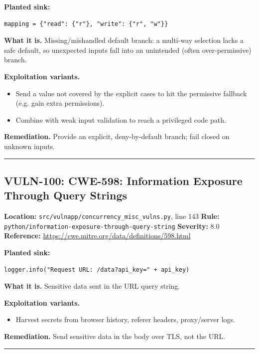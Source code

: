 \documentclass[11pt,a4paper]{article}
\begin{document}
\noindent\textbf{Planted sink:}
\begin{lstlisting}
mapping = {"read": {"r"}, "write": {"r", "w"}}
\end{lstlisting}
\noindent\textbf{What it is.} Missing/mishandled default branch: a multi-way selection lacks a safe default, so unexpected inputs fall into an unintended (often over-permissive) branch.

\noindent\textbf{Exploitation variants.}
\begin{itemize}[leftmargin=1.4em,itemsep=1pt,topsep=2pt]
\item Send a value not covered by the explicit cases to hit the permissive fallback (e.g. gain extra permissions).
\item Combine with weak input validation to reach a privileged code path.
\end{itemize}
\noindent\textbf{Remediation.} Provide an explicit, deny-by-default branch; fail closed on unknown inputs.

\vspace{4pt}\hrule\vspace{6pt}
\subsection{VULN-100: CWE-598: Information Exposure Through Query Strings}
\noindent\textbf{Location:} \texttt{src/vulnapp/concurrency\_misc\_vulns.py}, line 143 \quad \textbf{Rule:} \texttt{python/information-exposure-through-query-string} \quad \textbf{Severity:} 8.0
\\ \textbf{Reference:} \url{https://cwe.mitre.org/data/definitions/598.html}

\noindent\textbf{Planted sink:}
\begin{lstlisting}
logger.info("Request URL: /data?api_key=" + api_key)
\end{lstlisting}
\noindent\textbf{What it is.} Sensitive data sent in the URL query string.

\noindent\textbf{Exploitation variants.}
\begin{itemize}[leftmargin=1.4em,itemsep=1pt,topsep=2pt]
\item Harvest secrets from browser history, referer headers, proxy/server logs.
\end{itemize}
\noindent\textbf{Remediation.} Send sensitive data in the body over TLS, not the URL.

\vspace{4pt}\hrule\vspace{6pt}
\end{document}
